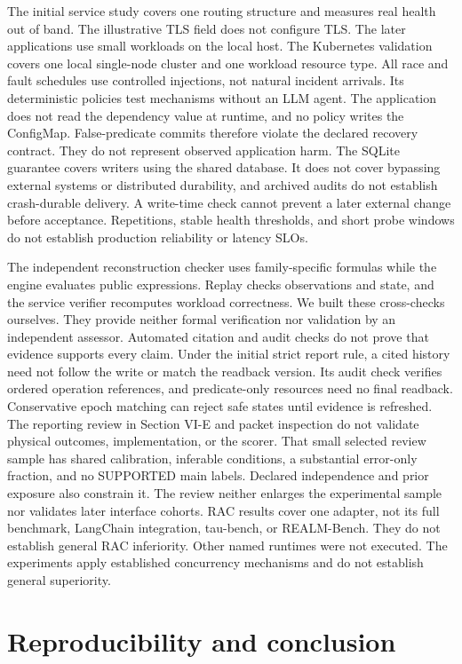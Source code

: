 \documentclass[conference,10pt]{IEEEtran}
\begin{document}
The initial service study covers one routing structure and measures real health out of band. The illustrative TLS field does not configure TLS. The later applications use small workloads on the local host. The Kubernetes validation covers one local single-node cluster and one workload resource type. All race and fault schedules use controlled injections, not natural incident arrivals. Its deterministic policies test mechanisms without an LLM agent. The application does not read the dependency value at runtime, and no policy writes the ConfigMap. False-predicate commits therefore violate the declared recovery contract. They do not represent observed application harm. The SQLite guarantee covers writers using the shared database. It does not cover bypassing external systems or distributed durability, and archived audits do not establish crash-durable delivery. A write-time check cannot prevent a later external change before acceptance. Repetitions, stable health thresholds, and short probe windows do not establish production reliability or latency SLOs.

The independent reconstruction checker uses family-specific formulas while the engine evaluates public expressions. Replay checks observations and state, and the service verifier recomputes workload correctness. We built these cross-checks ourselves. They provide neither formal verification nor validation by an independent assessor. Automated citation and audit checks do not prove that evidence supports every claim. Under the initial strict report rule, a cited history need not follow the write or match the readback version. Its audit check verifies ordered operation references, and predicate-only resources need no final readback. Conservative epoch matching can reject safe states until evidence is refreshed. The reporting review in Section VI-E and packet inspection do not validate physical outcomes, implementation, or the scorer. That small selected review sample has shared calibration, inferable conditions, a substantial error-only fraction, and no SUPPORTED main labels. Declared independence and prior exposure also constrain it. The review neither enlarges the experimental sample nor validates later interface cohorts. RAC results cover one adapter, not its full benchmark, LangChain integration, tau-bench, or REALM-Bench. They do not establish general RAC inferiority. Other named runtimes were not executed. The experiments apply established concurrency mechanisms and do not establish general superiority.

\section{Reproducibility and conclusion}
\end{document}
